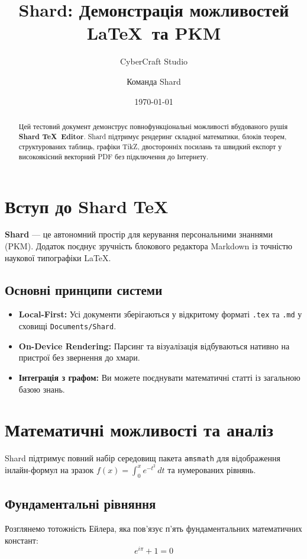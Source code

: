 \documentclass[11pt, a4paper]{article}
\title{\textbf{Shard: Демонстрація можливостей \LaTeX\ та PKM}}
\author{CyberCraft Studio \and Команда Shard}
\date{\today}
\begin{document}
\maketitle

\begin{abstract}
Цей тестовий документ демонструє повнофункціональні можливості вбудованого рушія \textbf{Shard \TeX\ Editor}. Shard підтримує рендеринг складної математики, блоків теорем, структурованих таблиць, графіки TikZ, двосторонніх посилань та швидкий експорт у високоякісний векторний PDF без підключення до Інтернету.
\end{abstract}

\tableofcontents

\newpage

\section{Вступ до Shard \TeX}
\label{sec:intro}

\textbf{Shard} — це автономний простір для керування персональними знаннями (PKM). Додаток поєднує зручність блокового редактора Markdown із точністю наукової типографіки \LaTeX.

\subsection{Основні принципи системи}
\begin{itemize}
    \item \textbf{Local-First:} Усі документи зберігаються у відкритому форматі \texttt{.tex} та \texttt{.md} у сховищі \texttt{Documents/Shard}.
    \item \textbf{On-Device Rendering:} Парсинг та візуалізація відбуваються нативно на пристрої без звернення до хмари.
    \item \textbf{Інтеграція з графом:} Ви можете поєднувати математичні статті із загальною базою знань.
\end{itemize}

\section{Математичні можливості та аналіз}
\label{sec:math}

Shard підтримує повний набір середовищ пакета \texttt{amsmath} для відображення інлайн-формул на зразок $f(x) = \int_{0}^{x} e^{-t^2} \, dt$ та нумерованих рівнянь.

\subsection{Фундаментальні рівняння}
Розглянемо тотожність Ейлера, яка пов'язує п'ять фундаментальних математичних констант:
\begin{equation}
\label{eq:euler}
e^{i\pi} + 1 = 0
\end{equation}
\end{document}
